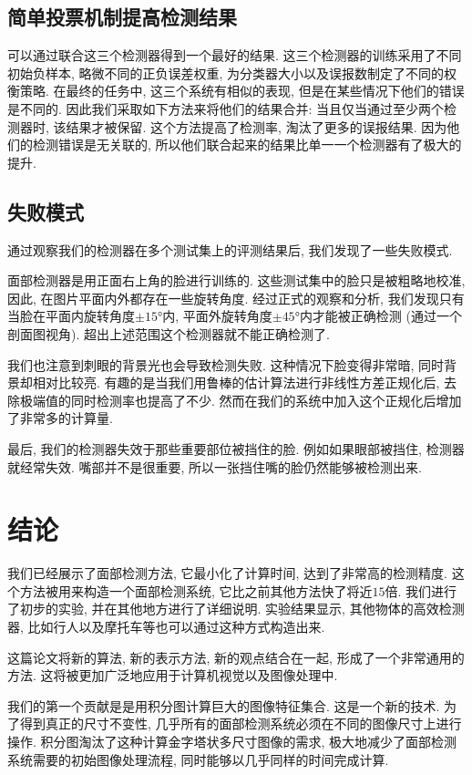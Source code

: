 \documentclass[a4paper,utf8,11pt]{ctexart}
\begin{document}
\subsection{简单投票机制提高检测结果}
可以通过联合这三个检测器得到一个最好的结果. 这三个检测器的训练采用了不同初始负样本, 略微不同的正负误差权重, 为分类器大小以及误报数制定了不同的权衡策略. 在最终的任务中, 这三个系统有相似的表现, 但是在某些情况下他们的错误是不同的. 因此我们采取如下方法来将他们的结果合并: 当且仅当通过至少两个检测器时, 该结果才被保留. 这个方法提高了检测率, 淘汰了更多的误报结果. 因为他们的检测错误是无关联的, 所以他们联合起来的结果比单一一个检测器有了极大的提升.

\subsection{失败模式}
通过观察我们的检测器在多个测试集上的评测结果后, 我们发现了一些失败模式.

面部检测器是用正面右上角的脸进行训练的. 这些测试集中的脸只是被粗略地校准, 因此, 在图片平面内外都存在一些旋转角度. 经过正式的观察和分析, 我们发现只有当脸在平面内旋转角度$\pm\ang{15}$内, 平面外旋转角度$\pm\ang{45}$内才能被正确检测 (通过一个剖面图视角). 超出上述范围这个检测器就不能正确检测了.

我们也注意到刺眼的背景光也会导致检测失败. 这种情况下脸变得非常暗, 同时背景却相对比较亮. 有趣的是当我们用鲁棒的估计算法进行非线性方差正规化后, 去除极端值的同时检测率也提高了不少. 然而在我们的系统中加入这个正规化后增加了非常多的计算量.

最后, 我们的检测器失效于那些重要部位被挡住的脸. 例如如果眼部被挡住, 检测器就经常失效. 嘴部并不是很重要, 所以一张挡住嘴的脸仍然能够被检测出来.

\section{结论}\label{sec:discussion}
我们已经展示了面部检测方法, 它最小化了计算时间, 达到了非常高的检测精度. 这个方法被用来构造一个面部检测系统, 它比之前其他方法快了将近$15$倍. 我们进行了初步的实验, 并在其他地方进行了详细说明. 实验结果显示, 其他物体的高效检测器, 比如行人以及摩托车等也可以通过这种方式构造出来.

这篇论文将新的算法, 新的表示方法, 新的观点结合在一起, 形成了一个非常通用的方法. 这将被更加广泛地应用于计算机视觉以及图像处理中.

我们的第一个贡献是是用积分图计算巨大的图像特征集合. 这是一个新的技术. 为了得到真正的尺寸不变性, 几乎所有的面部检测系统必须在不同的图像尺寸上进行操作. 积分图淘汰了这种计算金字塔状多尺寸图像的需求, 极大地减少了面部检测系统需要的初始图像处理流程, 同时能够以几乎同样的时间完成计算.
\end{document}
